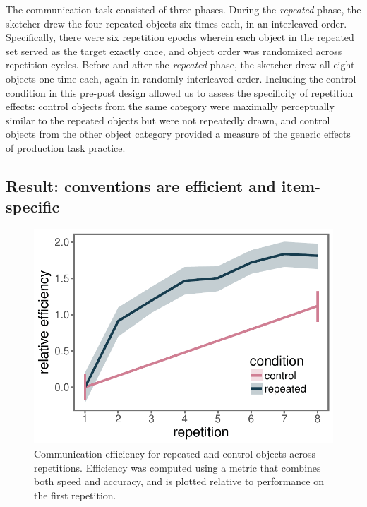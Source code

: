 \documentclass[10pt,letterpaper]{article}
\begin{document}
The communication task consisted of three phases. 
During the \textit{repeated} phase, the sketcher drew the four repeated objects six times each, in an interleaved order.
Specifically, there were six repetition epochs wherein each object in the repeated set served as the target exactly once, and object order was randomized across repetition cycles. 
Before and after the \textit{repeated} phase, the sketcher drew all eight objects one time each, again in randomly interleaved order. 
Including the control condition in this pre-post design allowed us to assess the specificity of repetition effects: control objects from the same category were maximally perceptually similar to the repeated objects but were not repeatedly drawn, and control objects from the other object category provided a measure of the generic effects of production task practice. 

\subsection{Result: conventions are efficient and item-specific}

\begin{figure}
\includegraphics[width=\linewidth]{figures/refgame_BIS_timeseries.pdf}
\caption{Communication efficiency for repeated and control objects across repetitions. Efficiency was computed using a metric that combines both speed and accuracy, and is plotted relative to performance on the first repetition.} \label{refgame_bis}
\end{figure}
\end{document}
